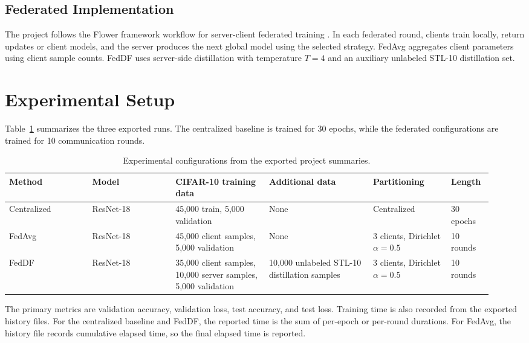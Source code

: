 \documentclass[11pt]{article}
\begin{document}
\subsection{Federated Implementation}

The project follows the Flower framework workflow for server-client federated training \cite{beutel2020flower}. In each federated round, clients train locally, return updates or client models, and the server produces the next global model using the selected strategy. FedAvg aggregates client parameters using client sample counts. FedDF uses server-side distillation with temperature $T=4$ and an auxiliary unlabeled STL-10 distillation set.

\section{Experimental Setup}

Table~\ref{tab:config} summarizes the three exported runs. The centralized baseline is trained for 30 epochs, while the federated configurations are trained for 10 communication rounds.

\begin{table}[ht]
\centering
\small
\setlength{\tabcolsep}{3pt}
\caption{Experimental configurations from the exported project summaries.}
\label{tab:config}
\begin{tabular}{@{}p{0.16\linewidth}p{0.16\linewidth}p{0.18\linewidth}p{0.20\linewidth}p{0.15\linewidth}p{0.08\linewidth}@{}}
\toprule
Method & Model & CIFAR-10 training data & Additional data & Partitioning & Length \\
\midrule
Centralized & ResNet-18 & 45,000 train, 5,000 validation & None & Centralized & 30 epochs \\
FedAvg & ResNet-18 & 45,000 client samples, 5,000 validation & None & 3 clients, Dirichlet $\alpha=0.5$ & 10 rounds \\
FedDF & ResNet-18 & 35,000 client samples, 10,000 server samples, 5,000 validation & 10,000 unlabeled STL-10 distillation samples & 3 clients, Dirichlet $\alpha=0.5$ & 10 rounds \\
\bottomrule
\end{tabular}
\end{table}

The primary metrics are validation accuracy, validation loss, test accuracy, and test loss. Training time is also recorded from the exported history files. For the centralized baseline and FedDF, the reported time is the sum of per-epoch or per-round durations. For FedAvg, the history file records cumulative elapsed time, so the final elapsed time is reported.
\end{document}
